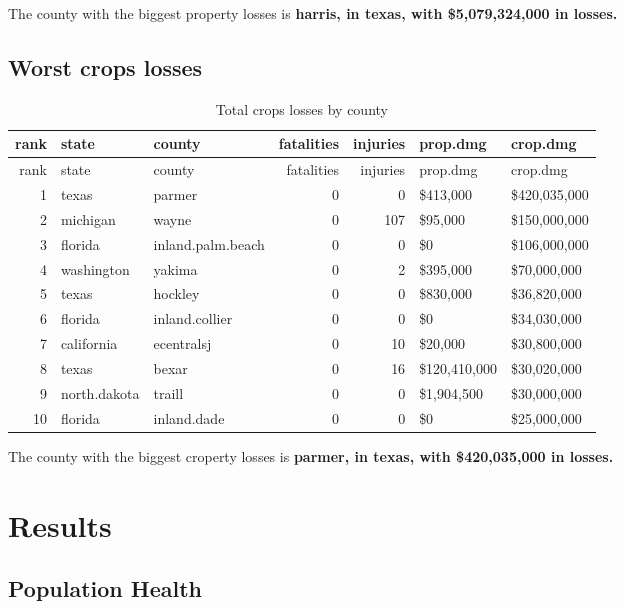 \documentclass[]{article}
\begin{document}
The county with the biggest property losses is \textbf{harris, in texas,
with \$5,079,324,000 in losses.}

\subsection{Worst crops losses}\label{worst-crops-losses}

\begin{longtable}[]{@{}rllrrll@{}}
\caption{Total crops losses by county}\tabularnewline
\toprule
rank & state & county & fatalities & injuries & prop.dmg &
crop.dmg\tabularnewline
\midrule
\endfirsthead
\toprule
rank & state & county & fatalities & injuries & prop.dmg &
crop.dmg\tabularnewline
\midrule
\endhead
1 & texas & parmer & 0 & 0 & \$413,000 & \$420,035,000\tabularnewline
2 & michigan & wayne & 0 & 107 & \$95,000 & \$150,000,000\tabularnewline
3 & florida & inland.palm.beach & 0 & 0 & \$0 &
\$106,000,000\tabularnewline
4 & washington & yakima & 0 & 2 & \$395,000 &
\$70,000,000\tabularnewline
5 & texas & hockley & 0 & 0 & \$830,000 & \$36,820,000\tabularnewline
6 & florida & inland.collier & 0 & 0 & \$0 & \$34,030,000\tabularnewline
7 & california & ecentralsj & 0 & 10 & \$20,000 &
\$30,800,000\tabularnewline
8 & texas & bexar & 0 & 16 & \$120,410,000 & \$30,020,000\tabularnewline
9 & north.dakota & traill & 0 & 0 & \$1,904,500 &
\$30,000,000\tabularnewline
10 & florida & inland.dade & 0 & 0 & \$0 & \$25,000,000\tabularnewline
\bottomrule
\end{longtable}

The county with the biggest croperty losses is \textbf{parmer, in texas,
with \$420,035,000 in losses.}

\section{Results}\label{results}

\subsection{Population Health}\label{population-health}
\end{document}
